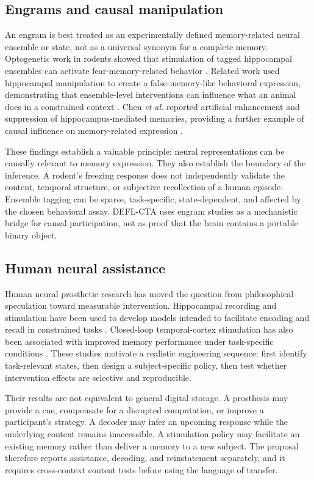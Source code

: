 \documentclass[conference]{IEEEtran}
\begin{document}
\subsection{Engrams and causal manipulation}
An engram is best treated as an experimentally defined memory-related neural ensemble or state, not as a universal synonym for a complete memory. Optogenetic work in rodents showed that stimulation of tagged hippocampal ensembles can activate fear-memory-related behavior \cite{Liu2012}. Related work used hippocampal manipulation to create a false-memory-like behavioral expression, demonstrating that ensemble-level interventions can influence what an animal does in a constrained context \cite{Ramirez2013}. Chen \textit{et al.} reported artificial enhancement and suppression of hippocampus-mediated memories, providing a further example of causal influence on memory-related expression \cite{Chen2019}.

These findings establish a valuable principle: neural representations can be causally relevant to memory expression. They also establish the boundary of the inference. A rodent's freezing response does not independently validate the content, temporal structure, or subjective recollection of a human episode. Ensemble tagging can be sparse, task-specific, state-dependent, and affected by the chosen behavioral assay. DEFL-CTA uses engram studies as a mechanistic bridge for causal participation, not as proof that the brain contains a portable binary object.

\subsection{Human neural assistance}
Human neural prosthetic research has moved the question from philosophical speculation toward measurable intervention. Hippocampal recording and stimulation have been used to develop models intended to facilitate encoding and recall in constrained tasks \cite{Hampson2018}. Closed-loop temporal-cortex stimulation has also been associated with improved memory performance under task-specific conditions \cite{Ezzyat2018}. These studies motivate a realistic engineering sequence: first identify task-relevant states, then design a subject-specific policy, then test whether intervention effects are selective and reproducible.

Their results are not equivalent to general digital storage. A prosthesis may provide a cue, compensate for a disrupted computation, or improve a participant's strategy. A decoder may infer an upcoming response while the underlying content remains inaccessible. A stimulation policy may facilitate an existing memory rather than deliver a memory to a new subject. The proposal therefore reports assistance, decoding, and reinstatement separately, and it requires cross-context content tests before using the language of transfer.
\end{document}
